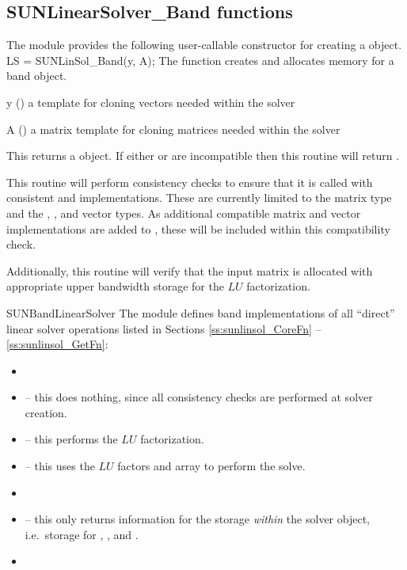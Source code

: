 \subsection{SUNLinearSolver\_Band functions}
\label{ss:sunlinsol_band_functions}

The {\sunlinsolband} module provides the following user-callable constructor
for creating a \newline {} object.
%
%
{
  LS = SUNLinSol\_Band(y, A);
}
{
  The function  creates and allocates memory for
  a band \newline {} object.
}
{
  \begin{args}[y]
  \item[y] ()
    a template for cloning vectors needed within the solver
  \item[A] ()
    a {\sunmatband} matrix template for cloning matrices needed
    within the solver 
  \end{args}
}
{
  This returns a  object.  If either  or
   are incompatible then this routine will return .
}
{
  This routine will perform consistency checks to ensure that it is
  called with consistent {\nvector} and {\sunmatrix} implementations.
  These are currently limited to the {\sunmatband} matrix type and
  the {\nvecs}, {\nvecopenmp}, and {\nvecpthreads} vector types.  As
  additional compatible matrix and vector implementations are added to
  {\sundials}, these will be included within this compatibility check.

  Additionally, this routine will verify that the input matrix 
  is allocated with appropriate upper bandwidth storage for the $LU$
  factorization.
}
{SUNBandLinearSolver}
%
%
The {\sunlinsolband} module defines band implementations of all
``direct'' linear solver operations listed in Sections
\ref{ss:sunlinsol_CoreFn} -- \ref{ss:sunlinsol_GetFn}:
\begin{itemize}
\item {}
\item {} -- this does nothing, since all
  consistency checks are performed at solver creation.
\item {} -- this performs the $LU$ factorization.
\item {} -- this uses the $LU$ factors
  and  array to perform the solve.
\item {}
\item {} -- this only returns information for
  the storage \emph{within} the solver object, i.e.~storage
  for , , and .
\item {}
\end{itemize}
